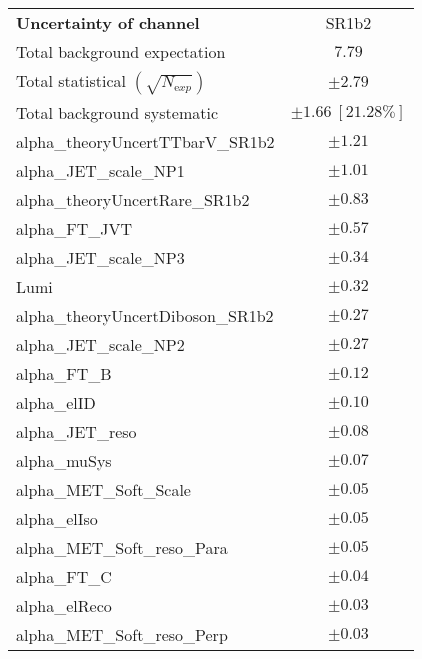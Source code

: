 
\begin{table}
\begin{center}
\setlength{\tabcolsep}{0.0pc}
\begin{tabular*}{\textwidth}{@{\extracolsep{\fill}}lc}
\noalign{\smallskip}\hline\noalign{\smallskip}
{\bfseries Uncertainty of channel}                                    & SR1b2            \\
\noalign{\smallskip}\hline\noalign{\smallskip}
Total background expectation             &  $7.79$       \\
\noalign{\smallskip}\hline\noalign{\smallskip}
Total statistical $(\sqrt{N_{\mathrm exp}})$              & $\pm 2.79$       \\
Total background systematic               & $\pm 1.66\ [21.28\%] $             \\
\noalign{\smallskip}\hline\noalign{\smallskip}
\noalign{\smallskip}\hline\noalign{\smallskip}
alpha\_theoryUncertTTbarV\_SR1b2         & $\pm 1.21$       \\
alpha\_JET\_scale\_NP1         & $\pm 1.01$       \\
alpha\_theoryUncertRare\_SR1b2         & $\pm 0.83$       \\
alpha\_FT\_JVT         & $\pm 0.57$       \\
alpha\_JET\_scale\_NP3         & $\pm 0.34$       \\
Lumi         & $\pm 0.32$       \\
alpha\_theoryUncertDiboson\_SR1b2         & $\pm 0.27$       \\
alpha\_JET\_scale\_NP2         & $\pm 0.27$       \\
alpha\_FT\_B         & $\pm 0.12$       \\
alpha\_elID         & $\pm 0.10$       \\
alpha\_JET\_reso         & $\pm 0.08$       \\
alpha\_muSys         & $\pm 0.07$       \\
alpha\_MET\_Soft\_Scale         & $\pm 0.05$       \\
alpha\_elIso         & $\pm 0.05$       \\
alpha\_MET\_Soft\_reso\_Para         & $\pm 0.05$       \\
alpha\_FT\_C         & $\pm 0.04$       \\
alpha\_elReco         & $\pm 0.03$       \\
alpha\_MET\_Soft\_reso\_Perp         & $\pm 0.03$       \\

\end{tabular*}
\end{center}
\end{table}
